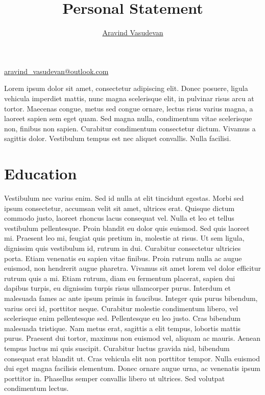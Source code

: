 \documentclass[12pt, letterpaper]{article}
\title{Personal Statement}
\author{\href{https://aravindvasudev.github.io/}{Aravind Vasudevan}}
\makeatletter
\newcommand{\email}{\href{mailto:aravind_vasudevan@outlook.com}{aravind\_vasudevan@outlook.com}}
\renewcommand{\maketitle}{
  \begin{center}
    {\color{headingcolor} \Huge \scshape \@title}
    \vspace{0.5em}
    \color[HTML]{2e4b64}{\rule{\linewidth}{0.5mm}}
    \par
    {\normalsize \color{headingcolor} \@author \hfill \email}
    \vspace{0.2em}
  \end{center}
}
\makeatother
\begin{document}
\maketitle

Lorem ipsum dolor sit amet, consectetur adipiscing elit. Donec posuere, ligula vehicula imperdiet mattis, nunc magna scelerisque elit, in pulvinar risus arcu at tortor. Maecenas congue, metus sed congue ornare, lectus risus varius magna, a laoreet sapien sem eget quam. Sed magna nulla, condimentum vitae scelerisque non, finibus non sapien. Curabitur condimentum consectetur dictum. Vivamus a sagittis dolor. Vestibulum tempus est nec aliquet convallis. Nulla facilisi.

\section*{Education}
Vestibulum nec varius enim. Sed id nulla at elit tincidunt egestas. Morbi sed ipsum consectetur, accumsan velit sit amet, ultrices erat. Quisque dictum commodo justo, laoreet rhoncus lacus consequat vel. Nulla et leo et tellus vestibulum pellentesque. Proin blandit eu dolor quis euismod. Sed quis laoreet mi. Praesent leo mi, feugiat quis pretium in, molestie at risus. Ut sem ligula, dignissim quis vestibulum id, rutrum in dui. Curabitur consectetur ultricies porta. Etiam venenatis eu sapien vitae finibus. Proin rutrum nulla ac augue euismod, non hendrerit augue pharetra. Vivamus sit amet lorem vel dolor efficitur rutrum quis a mi. Etiam rutrum, diam eu fermentum placerat, sapien dui dapibus turpis, eu dignissim turpis risus ullamcorper purus. Interdum et malesuada fames ac ante ipsum primis in faucibus. Integer quis purus bibendum, varius orci id, porttitor neque. Curabitur molestie condimentum libero, vel scelerisque enim pellentesque sed. Pellentesque eu leo justo. Cras bibendum malesuada tristique. Nam metus erat, sagittis a elit tempus, lobortis mattis purus. Praesent dui tortor, maximus non euismod vel, aliquam ac mauris. Aenean tempus luctus mi quis suscipit. Curabitur luctus gravida nisl, bibendum consequat erat blandit ut. Cras vehicula elit non porttitor tempor. Nulla euismod dui eget magna facilisis elementum. Donec ornare augue urna, ac venenatis ipsum porttitor in. Phasellus semper convallis libero ut ultrices. Sed volutpat condimentum lectus.
\end{document}

